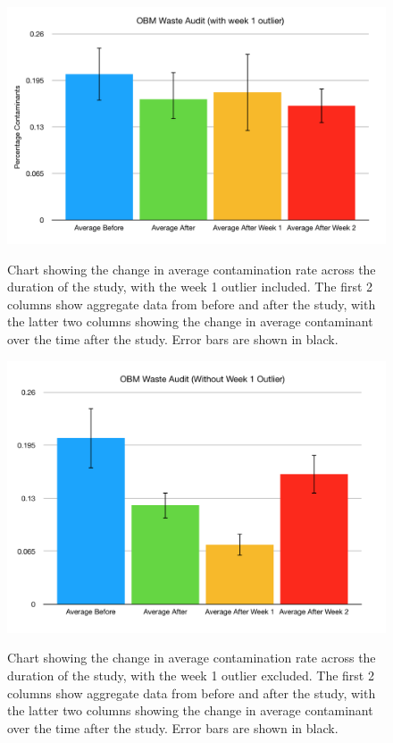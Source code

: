 \documentclass[nofonts,nols,justified,nobib]{tufte-book}
\begin{document}
\begin{figure}
  \caption{Chart showing the change in average contamination rate across the duration of the study, with the week 1 outlier included. The first 2 columns show aggregate data from before and after the study, with the latter two columns showing the change in average contaminant over the time after the study. Error bars are shown in black.}
  \includegraphics[width=1\linewidth]{img/4/finalresults/obm-outlier.png}
  \label{obm-outlier}
\end{figure}

\begin{figure}
  \caption{Chart showing the change in average contamination rate across the duration of the study, with the week 1 outlier excluded. The first 2 columns show aggregate data from before and after the study, with the latter two columns showing the change in average contaminant over the time after the study. Error bars are shown in black.}
  \includegraphics[width=1\linewidth]{img/4/finalresults/obm-no-outlier.png}
  \label{obm-no-outlier}
\end{figure}
\end{document}
